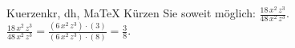 \begin{MAufgabe}{Kuerzen}{kr, dh, MaTeX}
K\"urzen Sie soweit m\"oglich: $\frac{18\, x^2\, z^3}{48\, x^2\, z^3}$.\\ 
\ifLsg\MLoesung
\quad $\frac{18\, x^2\, z^3}{48\, x^2\, z^3}=\frac{(6\, x^2\, z^3)\cdot(3)}{(6\, x^2\, z^3)\cdot(8)}=\frac{3}{8}$.\else\relax\fi
 \end{MAufgabe}